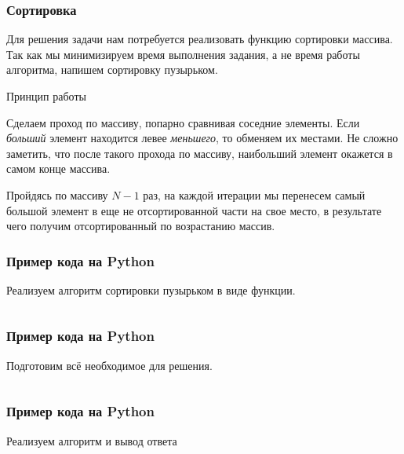 \documentclass{beamer}
\begin{document}
\begin{frame}

    \frametitle{Сортировка}

    Для решения задачи нам потребуется реализовать функцию сортировки массива. Так как мы минимизируем время выполнения задания, а не время работы алгоритма, напишем \alert{сортировку пузырьком}.

    \pause

    \begin{block}{Принцип работы}

        Сделаем проход по массиву, попарно сравнивая соседние элементы. Если \emph{больший} элемент находится левее \emph{меньшего}, то обменяем их местами. Не сложно заметить, что после такого прохода по массиву, наибольший элемент окажется в самом конце массива.

        Пройдясь по массиву $N - 1$ раз, на каждой итерации мы перенесем самый большой элемент в еще не отсортированной части на свое место, в результате чего получим отсортированный по возрастанию массив.

    \end{block}


\end{frame}

\begin{frame}[fragile]

    \frametitle{Пример кода на Python}

    Реализуем алгоритм сортировки пузырьком в виде функции.

    \inputminted[frame=single, fontsize=\small]{python}{src/task_26/sort.py}

\end{frame}

\begin{frame}[fragile]

    \frametitle{Пример кода на Python}

    Подготовим всё необходимое для решения.

    \inputminted[frame=single, fontsize=\small]{python}{src/task_26/declaration.py}

\end{frame}

\begin{frame}[fragile]

    \frametitle{Пример кода на Python}

    Реализуем алгоритм и вывод ответа

    \inputminted[frame=single, fontsize=\footnotesize]{python}{src/task_26/solution.py}

\end{frame}
\end{document}
